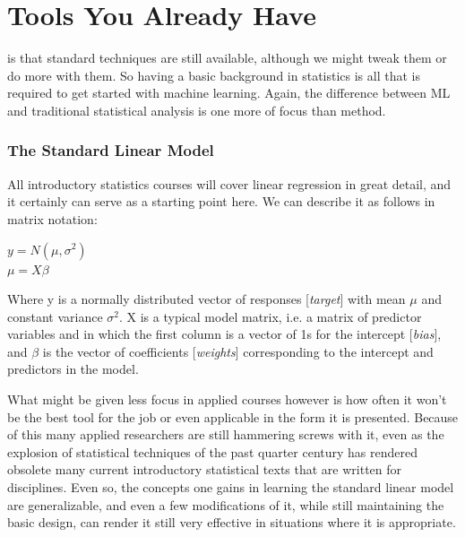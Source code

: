 \documentclass[english,nohyper,titlepage]{tufte-handout}
\begin{document}




\part{Tools You Already Have}

 is that standard techniques are still available, although we might tweak them or do more with them.  So having a basic background in statistics is all that is required to get started with machine learning.  Again, the difference between ML and traditional statistical analysis is one more of focus than method.

\section{The Standard Linear Model}
All introductory statistics courses will cover linear regression in great detail, and it certainly can serve as a starting point here.  We can describe it as follows in matrix notation:

\vspace{1cm}
\noindent$y = N(\mu,\sigma^{2})$\\
\noindent$\mu = X\beta$
\vspace{.25cm}

Where y is a normally distributed vector of responses [\emph{target}] with mean $\mu$ and constant variance $\sigma^{2}$.  X is a typical model matrix, i.e. a matrix of predictor variables and in which the first column is a vector of 1s for the intercept [\emph{bias}], and $\beta$ is the vector of coefficients [\emph{weights}] corresponding to the intercept and predictors in the model.

What might be given less focus in applied courses however is how often it won't be the best tool for the job or even applicable in the form it is presented.  Because of this many applied researchers are still hammering screws with it, even as the explosion of statistical techniques of the past quarter century has rendered obsolete many current introductory statistical texts that are written for disciplines.  Even so, the concepts one gains in learning the standard linear model are generalizable, and even a few modifications of it, while still maintaining the basic design, can render it still very effective in situations where it is appropriate.
\end{document}
